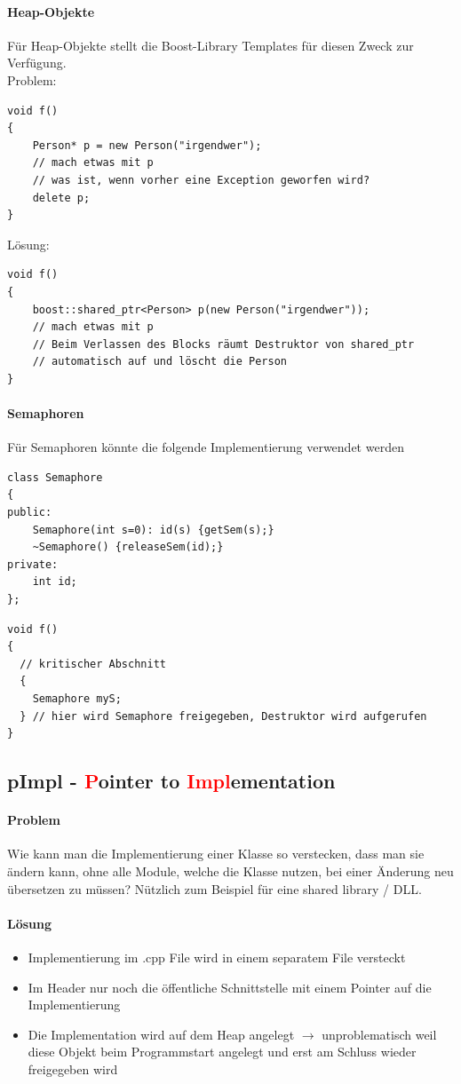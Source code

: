 \paragraph{Heap-Objekte}
Für Heap-Objekte stellt die Boost-Library Templates für diesen Zweck zur Verfügung.\\
Problem:
\begin{lstlisting}
void f()
{
	Person* p = new Person("irgendwer");
	// mach etwas mit p
	// was ist, wenn vorher eine Exception geworfen wird?
	delete p;
}
\end{lstlisting}

Lösung:
\begin{lstlisting}
void f()
{
	boost::shared_ptr<Person> p(new Person("irgendwer"));
	// mach etwas mit p
	// Beim Verlassen des Blocks räumt Destruktor von shared_ptr
	// automatisch auf und löscht die Person
}
\end{lstlisting}


\paragraph{Semaphoren} Für Semaphoren könnte die folgende Implementierung verwendet werden


\begin{lstlisting}
class Semaphore
{
public:
	Semaphore(int s=0): id(s) {getSem(s);}
	~Semaphore() {releaseSem(id);}
private:
	int id;
};
\end{lstlisting}
\begin{lstlisting}
void f()
{
  // kritischer Abschnitt
  {
    Semaphore myS;
  } // hier wird Semaphore freigegeben, Destruktor wird aufgerufen
}
\end{lstlisting}


\subsection[pImpl]{pImpl - \textcolor{red}{P}ointer to \textcolor{red}{Impl}ementation}
\label{sec:pimpl}

\paragraph{Problem} Wie kann man die Implementierung einer Klasse so verstecken, dass man sie
ändern kann, ohne alle Module, welche die Klasse nutzen, bei einer Änderung
neu übersetzen zu müssen?
Nützlich zum Beispiel für eine shared library / DLL.

\paragraph{Lösung}
\begin{itemize}
\item Implementierung im .cpp File wird in einem separatem File versteckt
\item Im Header nur noch die öffentliche Schnittstelle mit einem Pointer auf die Implementierung
\item Die Implementation wird auf dem Heap angelegt $\rightarrow$ unproblematisch weil diese Objekt beim Programmstart angelegt und erst am Schluss wieder freigegeben wird
\end{itemize}

